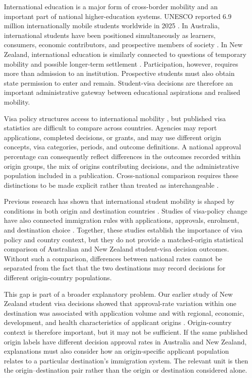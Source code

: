 \documentclass[runningheads]{llncs}
\begin{document}
International education is a major form of cross-border mobility and an important part of national higher-education systems. UNESCO reported 6.9 million internationally mobile students worldwide in 2025 \cite{UNESCO2025}. In Australia, international students have been positioned simultaneously as learners, consumers, economic contributors, and prospective members of society \cite{HongEtAl2023}. In New Zealand, international education is similarly connected to questions of temporary mobility and possible longer-term settlement \cite{KingEtAl2024}. Participation, however, requires more than admission to an institution. Prospective students must also obtain state permission to enter and remain. Student-visa decisions are therefore an important administrative gateway between educational aspirations and realised mobility.

Visa policy structures access to international mobility \cite{Neumayer2006,Mau2015}, but published visa statistics are difficult to compare across countries. Agencies may report applications, completed decisions, or grants, and may use different origin concepts, visa categories, periods, and outcome definitions. A national approval percentage can consequently reflect differences in the outcomes recorded within origin groups, the mix of origins contributing decisions, and the administrative population included in a publication. Cross-national comparison requires these distinctions to be made explicit rather than treated as interchangeable \cite{Kaplan2026CrossNationalDataPaper,Kaplan2026CountryToVisaDataset}.

Previous research has shown that international student mobility is shaped by conditions in both origin and destination countries \cite{PerkinsNeumayer2014,Weber2023}. Studies of visa-policy change have also connected immigration rules with applications, approvals, enrolment, and destination choice \cite{Chen2023,Gonnot2025,GharibEtAl2026}. Together, these studies establish the importance of visa policy and country context, but they do not provide a matched-origin statistical comparison of Australian and New Zealand student-visa decision outcomes. Without such a comparison, differences between national rates cannot be separated from the fact that the two destinations may record decisions for different origin-country populations.

This gap is part of a broader explanatory problem. Our earlier study of New Zealand student visa decisions showed that approval-rate variation within one destination was associated with application volume and with regional, economic, development, and health characteristics of applicant origins \cite{Kaplan2026NZVisaApproval}. Origin-country context is therefore important, but it may not be sufficient. If the same published origin labels have different decision approval rates in Australia and New Zealand, explanations must also consider how an origin-specific applicant population relates to a particular destination's immigration system. The relevant unit is then the origin--destination pair rather than the origin or destination considered alone.
\end{document}
